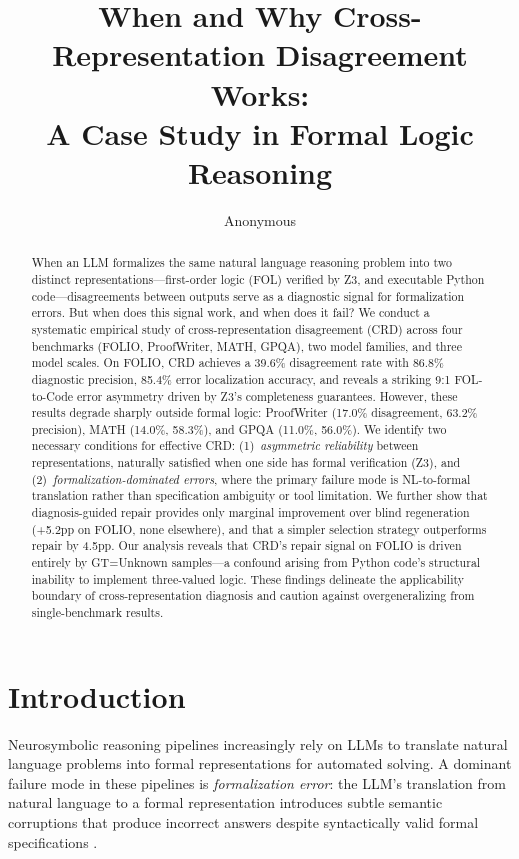 \documentclass[11pt,a4paper]{article}
\title{When and Why Cross-Representation Disagreement Works:\\A Case Study in Formal Logic Reasoning}
\author{Anonymous}
\date{}
\begin{document}
\maketitle

\begin{abstract}
When an LLM formalizes the same natural language reasoning problem into two distinct representations---first-order logic (FOL) verified by Z3, and executable Python code---disagreements between outputs serve as a diagnostic signal for formalization errors. But when does this signal work, and when does it fail? We conduct a systematic empirical study of cross-representation disagreement (CRD) across four benchmarks (FOLIO, ProofWriter, MATH, GPQA), two model families, and three model scales. On FOLIO, CRD achieves a 39.6\% disagreement rate with 86.8\% diagnostic precision, 85.4\% error localization accuracy, and reveals a striking 9:1 FOL-to-Code error asymmetry driven by Z3's completeness guarantees. However, these results degrade sharply outside formal logic: ProofWriter (17.0\% disagreement, 63.2\% precision), MATH (14.0\%, 58.3\%), and GPQA (11.0\%, 56.0\%). We identify two necessary conditions for effective CRD: (1)~\textit{asymmetric reliability} between representations, naturally satisfied when one side has formal verification (Z3), and (2)~\textit{formalization-dominated errors}, where the primary failure mode is NL-to-formal translation rather than specification ambiguity or tool limitation. We further show that diagnosis-guided repair provides only marginal improvement over blind regeneration (+5.2pp on FOLIO, none elsewhere), and that a simpler selection strategy outperforms repair by 4.5pp. Our analysis reveals that CRD's repair signal on FOLIO is driven entirely by GT=Unknown samples---a confound arising from Python code's structural inability to implement three-valued logic. These findings delineate the applicability boundary of cross-representation diagnosis and caution against overgeneralizing from single-benchmark results.
\end{abstract}

\section{Introduction}

Neurosymbolic reasoning pipelines increasingly rely on LLMs to translate natural language problems into formal representations for automated solving. A dominant failure mode in these pipelines is \textit{formalization error}: the LLM's translation from natural language to a formal representation introduces subtle semantic corruptions that produce incorrect answers despite syntactically valid formal specifications \cite{pan2023logic,olausson2023linc}.
\end{document}
